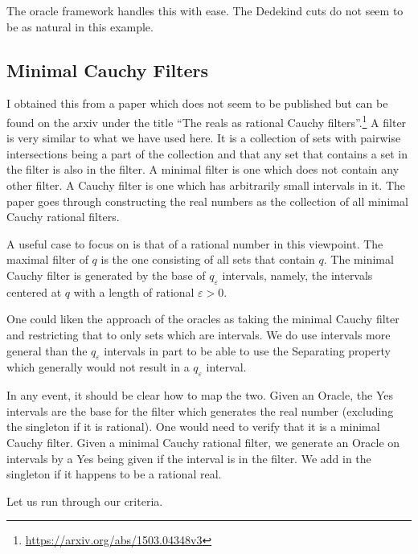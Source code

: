 \documentclass[12pt]{article}
\theoremstyle{remark}
\begin{document}
The oracle framework handles this with ease. The Dedekind cuts do not seem to be as natural in this example. 

\subsection{Minimal Cauchy Filters}

I obtained this from a paper which does not seem to be published but can be found on the arxiv under the title ``The reals as rational Cauchy filters''.\footnote{\url{https://arxiv.org/abs/1503.04348v3}} A filter is very similar to what we have used here. It is a collection of sets with pairwise intersections being a part of the collection and that any set that contains a set in the filter is also in the filter. A minimal filter is one which does not contain any other filter. A Cauchy filter is one which has arbitrarily small intervals in it. The paper goes through constructing the real numbers as the collection of all minimal Cauchy rational filters. 

A useful case to focus on is that of a rational number in this viewpoint. The maximal filter of $q$ is the one consisting of all sets that contain $q$. The minimal Cauchy filter is generated by the base of $q_{\varepsilon}$ intervals, namely, the intervals centered at $q$ with a length of rational $\varepsilon>0$.

One could liken the approach of the oracles as taking the minimal Cauchy filter and restricting that to only sets which are intervals. We do use intervals more general than the $q_{\varepsilon}$ intervals in part to be able to use the Separating property which generally would not result in a $q_\varepsilon$ interval. 

In any event, it should be clear how to map the two. Given an Oracle, the Yes intervals are the base for the filter which generates the real number (excluding the singleton if it is rational). One would need to verify that it is a minimal Cauchy filter. Given a minimal Cauchy rational filter, we generate an Oracle on intervals by a Yes being given if the interval is in the filter. We add in the singleton if it happens to be a rational real. 

Let us run through our criteria. 
\end{document}
